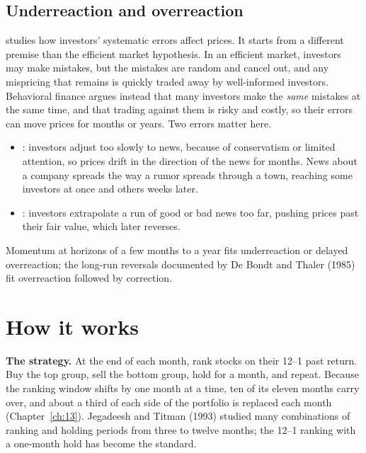 \subsection{Underreaction and overreaction}
\label{sec:05-behavior}

 studies how investors' systematic errors affect prices. It starts from a different premise than the efficient market hypothesis. In an efficient market, investors may make mistakes, but the mistakes are random and cancel out, and any mispricing that remains is quickly traded away by well-informed investors. Behavioral finance argues instead that many investors make the \emph{same} mistakes at the same time, and that trading against them is risky and costly, so their errors can move prices for months or years. Two errors matter here.

\begin{itemize}
  \item {}: investors adjust too slowly to news, because of conservatism or limited attention, so prices drift in the direction of the news for months. News about a company spreads the way a rumor spreads through a town, reaching some investors at once and others weeks later.
  \item {}: investors extrapolate a run of good or bad news too far, pushing prices past their fair value, which later reverses.
\end{itemize}

Momentum at horizons of a few months to a year fits underreaction or delayed overreaction; the long-run reversals documented by De Bondt and Thaler (1985) fit overreaction followed by correction.


\section{How it works}
\label{sec:05-how}

\textbf{The strategy.} At the end of each month, rank stocks on their 12--1 past return. Buy the top group, sell the bottom group, hold for a month, and repeat. Because the ranking window shifts by one month at a time, ten of its eleven months carry over, and about a third of each side of the portfolio is replaced each month (Chapter~\ref{ch:13}). Jegadeesh and Titman (1993) studied many combinations of ranking and holding periods from three to twelve months; the 12--1 ranking with a one-month hold has become the standard.

